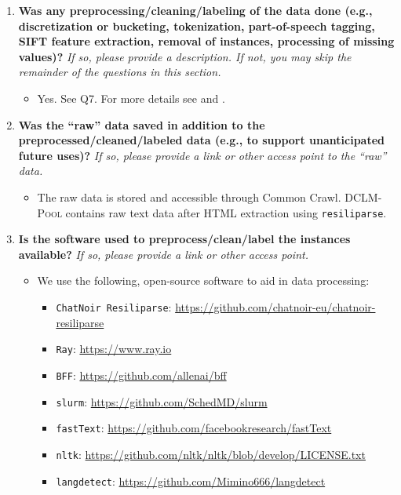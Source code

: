 \documentclass{article}
\newcommand{\rawpool}{\textsc{DCLM-Pool}\xspace}
\newcommand{\resiliparse}{\texttt{resiliparse}\xspace}
\newcommand{\fasttext}{\texttt{fastText}\xspace}
\newcommand{\commoncrawl}{Common Crawl\xspace}
\begin{document}
\begin{enumerate}[label=Q\arabic*, resume]

\item \textbf{Was any preprocessing/cleaning/labeling of the data done (e.g., discretization or bucketing, tokenization, part-of-speech tagging, SIFT feature extraction, removal of instances, processing of missing values)?} \textit{If so, please provide a description. If not, you may skip the remainder of the questions in this section.}

\begin{itemize}
\item Yes. See Q7.
For more details see  and .
\end{itemize}

\item \textbf{Was the “raw” data saved in addition to the preprocessed/cleaned/labeled data (e.g., to support unanticipated future uses)?} \textit{If so, please provide a link or other access point to the “raw” data.}

\begin{itemize}
\item The raw data is stored and accessible through \commoncrawl. \rawpool contains raw text data after HTML extraction using \resiliparse.
\end{itemize}

\item \textbf{Is the software used to preprocess/clean/label the instances available?} \textit{If so, please provide a link or other access point.}

\begin{itemize}
\item We use the following, open-source software to aid in data processing:
\begin{itemize}
\item \texttt{ChatNoir Resiliparse}: \url{https://github.com/chatnoir-eu/chatnoir-resiliparse}
\item \texttt{Ray}: \url{https://www.ray.io}
\item \texttt{BFF}: \url{https://github.com/allenai/bff}
\item \texttt{slurm}: \url{https://github.com/SchedMD/slurm}
\item \fasttext: \url{https://github.com/facebookresearch/fastText}
\item \texttt{nltk}: \url{https://github.com/nltk/nltk/blob/develop/LICENSE.txt}
\item \texttt{langdetect}: \url{https://github.com/Mimino666/langdetect}


\end{itemize}
\end{itemize}
\end{enumerate}
\end{document}
